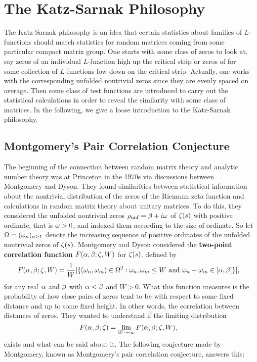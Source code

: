 \chapter{The Katz-Sarnak Philosophy}
  The Katz-Sarnak philosophy is an idea that certain statistics about families of $L$-functions should match statistics for random matrices coming from some particular compact matrix group. One starts with some class of zeros to look at, say zeros of an individual $L$-function high up the critical strip or zeros of for some collection of $L$-functions low down on the critical strip. Actually, one works with the corresponding unfolded nontrivial zeros since they are evenly spaced on average. Then some class of test functions are introduced to carry out the statistical calculations in order to reveal the similarity with some class of matrices. In the following, we give a loose introduction to the Katz-Sarnak philosophy.
  \section{Montgomery's Pair Correlation Conjecture}
    The beginning of the connection between random matrix theory and analytic number theory was at Princeton in the 1970s via discussions between Montgomery and Dyson. They found similarities between statistical information about the nontrivial distribution of the zeros of the Riemann zeta function and calculations in random matrix theory about unitary matrices. To do this, they considered the unfolded nontrivial zeros $\rho_{\text{unf}} = \beta+i\omega$ of $\zeta(s)$ with positive ordinate, that is $\omega > 0$, and indexed them according to the size of ordinate. So let $\Omega = (\omega_{n})_{n \ge 1}$ denote the increasing sequence of positive ordinates of the unfolded nontrivial zeros of $\zeta(s)$. Montgomery and Dyson considered the \textbf{two-point correlation function} $F(\alpha,\beta;\zeta,W)$ for $\zeta(s)$, defined by
    \[
      F(\alpha,\beta;\zeta,W) = \frac{1}{W}|\{(\omega_{n},\omega_{m}) \in \Omega^{2}:\text{$\omega_{n},\omega_{m} \le W$ and $\omega_{n}-\omega_{m} \in [\alpha,\beta]$}\}|,
    \]
    for any real $\alpha$ and $\beta$ with $\alpha < \beta$ and $W > 0$. What this function measures is the probability of how close pairs of zeros tend to be with respect to some fixed distance and up to some fixed height. In other words, the correlation between distances of zeros. They wanted to understand if the limiting distribution
    \[
      F(\alpha,\beta;\zeta) = \lim_{W \to \infty}F(\alpha,\beta;\zeta,W),
    \]
    exists and what can be said about it. The following conjecture made by Montgomery, known as Montgomery's pair correlation conjecture, answers this:


